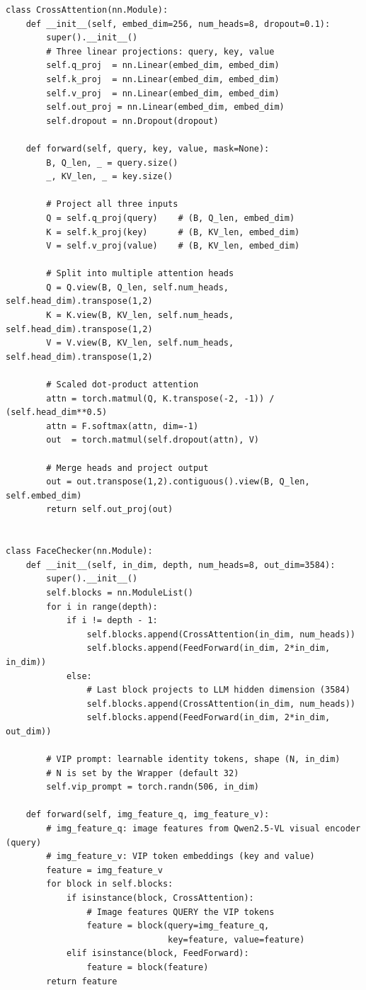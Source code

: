 \documentclass[12pt,a4paper]{article}
\begin{document}
\begin{lstlisting}[caption={FaceChecker.py -- CrossAttention and FaceChecker classes (condensed)}]
class CrossAttention(nn.Module):
    def __init__(self, embed_dim=256, num_heads=8, dropout=0.1):
        super().__init__()
        # Three linear projections: query, key, value
        self.q_proj  = nn.Linear(embed_dim, embed_dim)
        self.k_proj  = nn.Linear(embed_dim, embed_dim)
        self.v_proj  = nn.Linear(embed_dim, embed_dim)
        self.out_proj = nn.Linear(embed_dim, embed_dim)
        self.dropout = nn.Dropout(dropout)

    def forward(self, query, key, value, mask=None):
        B, Q_len, _ = query.size()
        _, KV_len, _ = key.size()

        # Project all three inputs
        Q = self.q_proj(query)    # (B, Q_len, embed_dim)
        K = self.k_proj(key)      # (B, KV_len, embed_dim)
        V = self.v_proj(value)    # (B, KV_len, embed_dim)

        # Split into multiple attention heads
        Q = Q.view(B, Q_len, self.num_heads, self.head_dim).transpose(1,2)
        K = K.view(B, KV_len, self.num_heads, self.head_dim).transpose(1,2)
        V = V.view(B, KV_len, self.num_heads, self.head_dim).transpose(1,2)

        # Scaled dot-product attention
        attn = torch.matmul(Q, K.transpose(-2, -1)) / (self.head_dim**0.5)
        attn = F.softmax(attn, dim=-1)
        out  = torch.matmul(self.dropout(attn), V)

        # Merge heads and project output
        out = out.transpose(1,2).contiguous().view(B, Q_len, self.embed_dim)
        return self.out_proj(out)


class FaceChecker(nn.Module):
    def __init__(self, in_dim, depth, num_heads=8, out_dim=3584):
        super().__init__()
        self.blocks = nn.ModuleList()
        for i in range(depth):
            if i != depth - 1:
                self.blocks.append(CrossAttention(in_dim, num_heads))
                self.blocks.append(FeedForward(in_dim, 2*in_dim, in_dim))
            else:
                # Last block projects to LLM hidden dimension (3584)
                self.blocks.append(CrossAttention(in_dim, num_heads))
                self.blocks.append(FeedForward(in_dim, 2*in_dim, out_dim))

        # VIP prompt: learnable identity tokens, shape (N, in_dim)
        # N is set by the Wrapper (default 32)
        self.vip_prompt = torch.randn(506, in_dim)

    def forward(self, img_feature_q, img_feature_v):
        # img_feature_q: image features from Qwen2.5-VL visual encoder (query)
        # img_feature_v: VIP token embeddings (key and value)
        feature = img_feature_v
        for block in self.blocks:
            if isinstance(block, CrossAttention):
                # Image features QUERY the VIP tokens
                feature = block(query=img_feature_q,
                                key=feature, value=feature)
            elif isinstance(block, FeedForward):
                feature = block(feature)
        return feature
\end{lstlisting}
\end{document}
